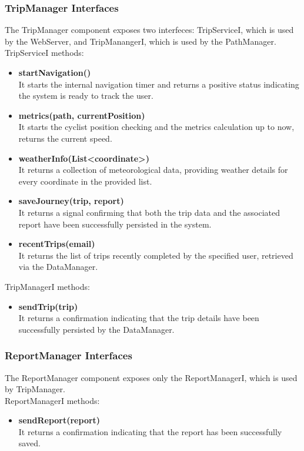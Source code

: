 \subsubsection{TripManager Interfaces}
The TripManager component exposes two interfeces: TripServiceI, which is used by the WebServer, and TripManangerI, which is used by the PathManager.\\
TripServiceI methods:
\begin{itemize}
    \item \textbf{startNavigation()}\\
    It starts the internal navigation timer and returns a positive status indicating the system is ready to track the user.
    \item \textbf{metrics(path, currentPosition)}\\
    It starts the cyclist position checking and the metrics calculation up to now, returns the current speed.
    \item \textbf{weatherInfo(List<coordinate>)}\\
    It returns a collection of meteorological data, providing weather details for every coordinate in the provided list.
    \item \textbf{saveJourney(trip, report)}\\
    It returns a signal confirming that both the trip data and the associated report have been successfully persisted in the system.
    \item \textbf{recentTrips(email)}\\
    It returns the list of trips recently completed by the specified user, retrieved via the DataManager.
    
\end{itemize}
TripManagerI methods:
\begin{itemize}
    \item \textbf{sendTrip(trip)}\\
    It returns a confirmation indicating that the trip details have been successfully persisted by the DataManager.
\end{itemize}
\subsubsection{ReportManager Interfaces}
The ReportManager component exposes only the ReportManagerI, which is used by TripManager.\\
ReportManagerI methods:
\begin{itemize}
    \item \textbf{sendReport(report)}\\
    It returns a confirmation indicating that the report has been successfully saved.
\end{itemize}

